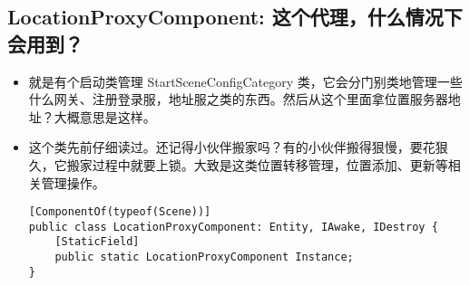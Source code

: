 \documentclass[9pt, b5paper]{article}
\begin{document}
\subsection{LocationProxyComponent: 这个代理，什么情况下会用到？}
\label{sec-7-4}
\begin{itemize}
\item 就是有个启动类管理 StartSceneConfigCategory 类，它会分门别类地管理一些什么网关、注册登录服，地址服之类的东西。然后从这个里面拿位置服务器地址？大概意思是这样。
\item 这个类先前仔细读过。还记得小伙伴搬家吗？有的小伙伴搬得狠慢，要花狠久，它搬家过程中就要上锁。大致是这类位置转移管理，位置添加、更新等相关管理操作。
\begin{verbatim}
[ComponentOf(typeof(Scene))]
public class LocationProxyComponent: Entity, IAwake, IDestroy {
    [StaticField]
    public static LocationProxyComponent Instance;
}
\end{verbatim}
\end{itemize}
\end{document}
